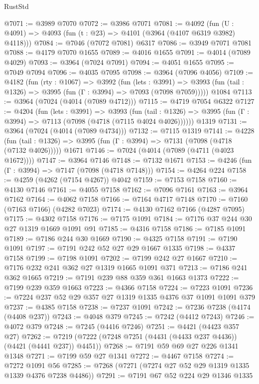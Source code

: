 \begin{lexlean}{RustStd}
\begin{coremodule}
{\begin{coremodule}
{{{{{{{{{{{{{{{{{{{{{{{{{{{{{{{{{{{{{{@7071 := @3989 @7070
@7072 := @3986 @7071
@7081 := @4092 (fun (U : @4091) => @4093 (fun (t : @23) => @4101 (@3964 (@4107 @6319 @3982) @4118)))
@7084 := @7046 (@7072 @7081) @6317
@7086 := @3949 @7071 @7081
@7088 := @4179 @7070 @1655
@7089 := @4016 @1655
@7091 := @4014 (@7089 @4029)
@7093 := @3964 (@7024 @7091)
@7094 := @4051 @1655
@7095 := @7049 @7094
@7096 := @4035 @7095
@7098 := @3964 (@7096 @4056)
@7109 := @4182
    (fun (rty : @1067) =>
    @3992
      (fun (lets : @3991) =>
      @3993 (fun (tail : @1326) => @3995 (fun (Γ : @3994) => @7093 (@7098 @7059)))))
    @1084
@7113 := @3964 (@7024 (@4014 (@7089 @4712)))
@7115 := @4719 @7054 @6322
@7127 := @4204
    (fun (lets : @3991) =>
    @3993
      (fun (tail : @1326) => @3995 (fun (Γ : @3994) => @7113 (@7098 (@4718 (@7115 @4024 @4026))))))
    @1319
@7131 := @3964 (@7024 (@4014 (@7089 @4734)))
@7132 := @7115 @1319
@7141 := @4228
    (fun (tail : @1326) => @3995 (fun (Γ : @3994) => @7131 (@7098 (@4718 (@7132 @4026)))))
    @1671
@7146 := @7024 (@4014 (@7089 (@4711 (@4023 @1672))))
@7147 := @3964 @7146
@7148 := @7132 @1671
@7153 := @4246 (fun (Γ : @3994) => @7147 (@7098 (@4718 @7148)))
@7154 := @4264 @224
@7158 := @4259 (@4262 (@7154 @4267)) @4042
@7159 := @7153 @7158
@7160 := @4130 @7146
@7161 := @4055 @7158
@7162 := @7096 @7161
@7163 := @3964 @7162
@7164 := @4062 @7158
@7166 := @7164 @4717 @7148
@7170 := @7160 (@7163 @7166) (@4282 @7023)
@7174 := @4130 @7162 @7166 (@4287 @7095)
@7175 := @4302 @7158
@7176 := @7175 @1091
@7184 := @7176 @37 @244 @30 @27 @1319 @1669 @1091 @91
@7185 := @4316 @7158
@7186 := @7185 @1091
@7189 := @7186 @244 @30 @1669
@7190 := @4325 @7158
@7191 := @7190 @1091
@7197 := @7191 @242 @52 @27 @29 @1667 @1335
@7198 := @4337 @7158
@7199 := @7198 @1091
@7202 := @7199 @242 @27 @1667
@7210 := @7176 @232 @241 @362 @27 @1319 @1665 @1091 @371
@7213 := @7186 @241 @362 @1665
@7219 := @7191 @239 @88 @359 @361 @1663 @1373
@7222 := @7199 @239 @359 @1663
@7223 := @4366 @7158
@7224 := @7223 @1091
@7236 := @7224 @237 @52 @29 @357 @27 @1319 @1335 @4376 @37 @1091 @1091 @379
@7237 := @4385 @7158
@7238 := @7237 @1091
@7242 := @7236 @7238 (@4174 (@4408 @237))
@7243 := @4048 @379
@7245 := @7242 (@4412 @7243)
@7246 := @4072 @379
@7248 := @7245 (@4416 @7246)
@7251 := @4421 (@4423 @357 @27)
@7262 := @7219 (@7222 (@7248 @7251 (@4431 (@4433 @237 @4436)) (@4421 (@4441 @237)) @4451))
@7268 := @7191 @59 @69 @27 @226 @1341 @1348
@7271 := @7199 @59 @27 @1341
@7272 := @4467 @7158
@7274 := @7272 @1091 @56
@7285 := @7268 (@7271 (@7274 @27 @52 @29 @1319 @1335 @1339 @4376 @7238 @4486))
@7291 := @7191 @67 @52 @224 @29 @1346 @1335
}}}}}}}}}}}}}}}}}}}}}}}}}}}}}}}}}}}}}}
\end{coremodule}}
\end{coremodule}
\end{lexlean}
